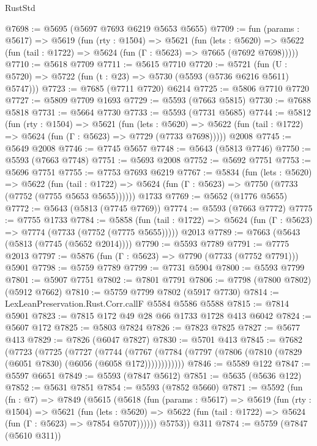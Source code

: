 \begin{lexlean}{RustStd}
\begin{coremodule}
@7698 := @5695 (@5697 @7693 @6219 @5653 @5655)
@7709 := fun (params : @5617) =>
  @5619
    (fun (rty : @1504) =>
    @5621
      (fun (lets : @5620) =>
      @5622 (fun (tail : @1722) => @5624 (fun (Γ : @5623) => @7665 (@7692 @7698)))))
@7710 := @5618 @7709
@7711 := @5615 @7710
@7720 := @5721 (fun (U : @5720) => @5722 (fun (t : @23) => @5730 (@5593 (@5736 @6216 @5611) @5747)))
@7723 := @7685 (@7711 @7720) @6214
@7725 := @5806 @7710 @7720
@7727 := @5809 @7709 @1693
@7729 := @5593 (@7663 @5815)
@7730 := @7688 @5818
@7731 := @5664 @7730
@7733 := @5593 (@7731 @5685)
@7744 := @5812
    (fun (rty : @1504) =>
    @5621
      (fun (lets : @5620) =>
      @5622 (fun (tail : @1722) => @5624 (fun (Γ : @5623) => @7729 (@7733 @7698)))))
    @2008
@7745 := @5649 @2008
@7746 := @7745 @5657
@7748 := @5643 (@5813 @7746)
@7750 := @5593 (@7663 @7748)
@7751 := @5693 @2008
@7752 := @5692 @7751
@7753 := @5696 @7751
@7755 := @7753 @7693 @6219
@7767 := @5834
    (fun (lets : @5620) =>
    @5622
      (fun (tail : @1722) => @5624 (fun (Γ : @5623) => @7750 (@7733 (@7752 (@7755 @5653 @5655))))))
    @1733
@7769 := @5652 (@1776 @5655)
@7772 := @5643 (@5813 (@7745 @7769))
@7774 := @5593 (@7663 @7772)
@7775 := @7755 @1733
@7784 := @5858
    (fun (tail : @1722) => @5624 (fun (Γ : @5623) => @7774 (@7733 (@7752 (@7775 @5655)))))
    @2013
@7789 := @7663 (@5643 (@5813 (@7745 (@5652 @2014))))
@7790 := @5593 @7789
@7791 := @7775 @2013
@7797 := @5876 (fun (Γ : @5623) => @7790 (@7733 (@7752 @7791))) @5901
@7798 := @5759 @7789
@7799 := @7731 @5904
@7800 := @5593 @7799
@7801 := @5907 @7751
@7802 := @7801 @7791
@7806 := @7798 (@7800 @7802) (@5912 @7662)
@7810 := @5759 @7799 @7802 (@5917 @7730)
@7814 := LexLeanPreservation.Rust.Corr.callF @5584 @5586 @5588
@7815 := @7814 @5901
@7823 := @7815 @172 @49 @28 @66 @1733 @1728 @413 @6042
@7824 := @5607 @172
@7825 := @5803 @7824
@7826 := @7823 @7825
@7827 := @5677 @413
@7829 := @7826 (@6047 @7827)
@7830 := @5701 @413
@7845 := @7682
    (@7723
      (@7725
        (@7727
          (@7744
            (@7767 (@7784 (@7797 (@7806 (@7810 (@7829 (@6051 @7830) (@6056 (@6058 @172))))))))))))
@7846 := @5589 @122
@7847 := @5597 @6651
@7849 := @5593 (@7847 @5612)
@7851 := @5635 (@5636 @122)
@7852 := @5631 @7851
@7854 := @5593 (@7852 @5660)
@7871 := @5592
    (fun (fn : @7) =>
    @7849
      (@5615
        (@5618
          (fun (params : @5617) =>
          @5619
            (fun (rty : @1504) =>
            @5621
              (fun (lets : @5620) =>
              @5622 (fun (tail : @1722) => @5624 (fun (Γ : @5623) => @7854 @5707))))))
        @5753))
    @311
@7874 := @5759 (@7847 (@5610 @311))

\end{coremodule}
\end{lexlean}
